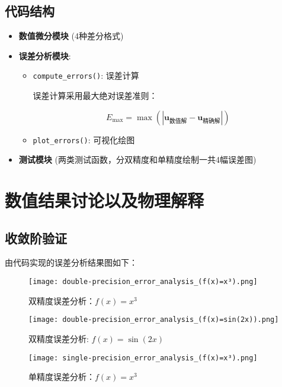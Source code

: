 \documentclass[12pt,a4paper]{article}
\begin{document}
\subsection{代码结构}
\begin{itemize}
    \item \textbf{数值微分模块} (4种差分格式)
    \item \textbf{误差分析模块}:
    \begin{itemize}
        \item \texttt{compute\_errors()}: 误差计算

        误差计算采用最大绝对误差准则：

        \[E_{\text{max}} = \max\left(\left|\mathbf{u}_{\text{数值解}} - \mathbf{u}_{\text{精确解}}\right|\right)\]

        \item \texttt{plot\_errors()}: 可视化绘图
    \end{itemize}
    \item \textbf{测试模块} (两类测试函数，分双精度和单精度绘制一共4幅误差图)
\end{itemize}

\section{数值结果讨论以及物理解释}

\subsection{收敛阶验证}

由代码实现的误差分析结果图如下：
\newpage

\begin{figure}[!htbp]
    \centering
    \texttt{[image: double-precision\_error\_analysis\_(f(x)=x³).png]}
    \caption{双精度误差分析：$f(x) = x^3$}
\end{figure}

\begin{figure}[!htbp]
    \centering
    \texttt{[image: double-precision\_error\_analysis\_(f(x)=sin(2x)).png]}
    \caption{双精度误差分析: $f(x) = \sin(2x)$}
\end{figure}
\newpage

\begin{figure}[!htbp]
    \centering
    \texttt{[image: single-precision\_error\_analysis\_(f(x)=x³).png]}
    \caption{单精度误差分析：$f(x) = x^3$}
\end{figure}
\end{document}

